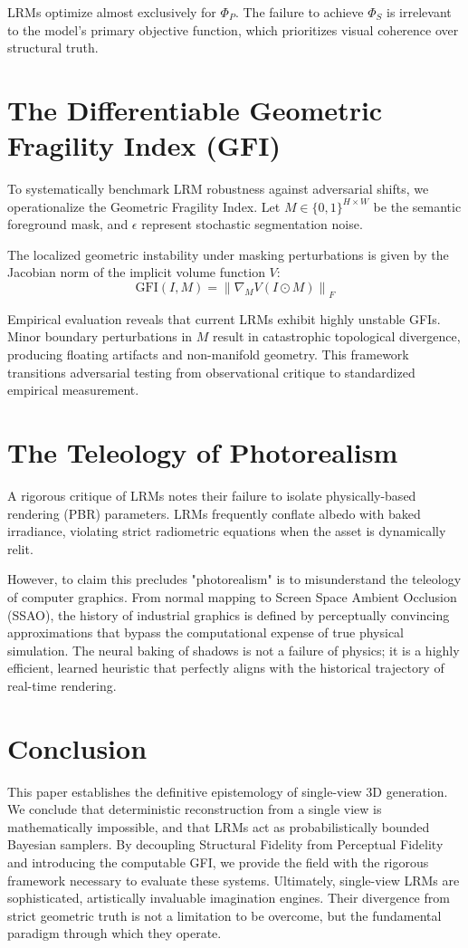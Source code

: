 \documentclass[10pt,journal,compsoc]{IEEEtran}
\begin{document}
LRMs optimize almost exclusively for $\Phi_P$. The failure to achieve $\Phi_S$ is irrelevant to the model's primary objective function, which prioritizes visual coherence over structural truth.

\section{The Differentiable Geometric Fragility Index (GFI)}
To systematically benchmark LRM robustness against adversarial shifts, we operationalize the Geometric Fragility Index. Let $M \in \{0,1\}^{H \times W}$ be the semantic foreground mask, and $\epsilon$ represent stochastic segmentation noise. 

\begin{definition}
The localized geometric instability under masking perturbations is given by the Jacobian norm of the implicit volume function $V$:
\[ \text{GFI}(I, M) = \left\| \nabla_M V(I \odot M) \right\|_F \]
\end{definition}

Empirical evaluation reveals that current LRMs exhibit highly unstable GFIs. Minor boundary perturbations in $M$ result in catastrophic topological divergence, producing floating artifacts and non-manifold geometry. This framework transitions adversarial testing from observational critique to standardized empirical measurement.

\section{The Teleology of Photorealism}
A rigorous critique of LRMs notes their failure to isolate physically-based rendering (PBR) parameters. LRMs frequently conflate albedo with baked irradiance, violating strict radiometric equations when the asset is dynamically relit.

However, to claim this precludes "photorealism" is to misunderstand the teleology of computer graphics. From normal mapping to Screen Space Ambient Occlusion (SSAO), the history of industrial graphics is defined by perceptually convincing approximations that bypass the computational expense of true physical simulation. The neural baking of shadows is not a failure of physics; it is a highly efficient, learned heuristic that perfectly aligns with the historical trajectory of real-time rendering. 

\section{Conclusion}
This paper establishes the definitive epistemology of single-view 3D generation. We conclude that deterministic reconstruction from a single view is mathematically impossible, and that LRMs act as probabilistically bounded Bayesian samplers. By decoupling Structural Fidelity from Perceptual Fidelity and introducing the computable GFI, we provide the field with the rigorous framework necessary to evaluate these systems. Ultimately, single-view LRMs are sophisticated, artistically invaluable imagination engines. Their divergence from strict geometric truth is not a limitation to be overcome, but the fundamental paradigm through which they operate.
\end{document}
